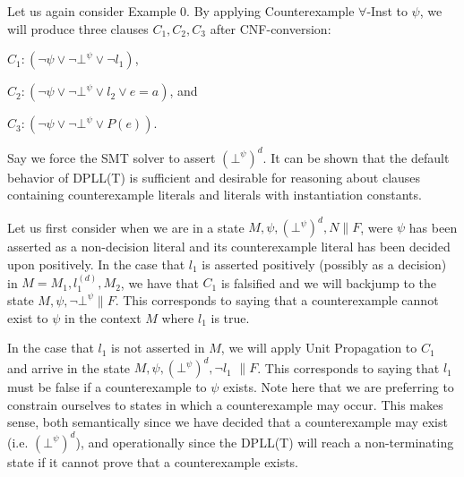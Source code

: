 \documentclass{llncs}
\begin{document}
Let us again consider Example 0.
By applying Counterexample $\forall$-Inst to $\psi$, we will produce three clauses $C_1, C_2, C_3$ after CNF-conversion:

$C_1 : ( \neg \psi \vee \neg \bot^\psi \vee \neg l_1 )$,

$C_2 : ( \neg \psi \vee \neg \bot^\psi \vee l_2 \vee e = a )$, and

$C_3 : ( \neg \psi \vee \neg \bot^\psi \vee P( e ) )$.

Say we force the SMT solver to assert $( \bot^\psi )^d$.
It can be shown that the default behavior of DPLL(T) is sufficient and desirable for reasoning about clauses containing counterexample literals and literals with instantiation constants.

Let us first consider when we are in a state $M, \psi, ( \bot^\psi )^d, N \parallel F$, were $\psi$ has been asserted as a non-decision literal and its counterexample literal has been decided upon positively.
In the case that $l_1$ is asserted positively (possibly as a decision) in $M = M_1, l^{(d)}_1, M_2$, we have that $C_1$ is falsified and we will backjump to the state $M, \psi, \neg \bot^\psi \parallel F$.
This corresponds to saying that a counterexample cannot exist to $\psi$ in the context $M$ where $l_1$ is true.

In the case that $l_1$ is not asserted in $M$, we will apply Unit Propagation to $C_1$ and arrive in the state $M, \psi, ( \bot^\psi )^d, \neg l_1$ $\parallel F$.
This corresponds to saying that $l_1$ must be false if a counterexample to $\psi$ exists.
Note here that we are preferring to constrain ourselves to states in which a counterexample may occur.
This makes sense, both semantically since we have decided that a counterexample may exist (i.e. $( \bot^\psi )^d$), and operationally since the DPLL(T) will reach a non-terminating state if it cannot prove that a counterexample exists.

\end{document}
